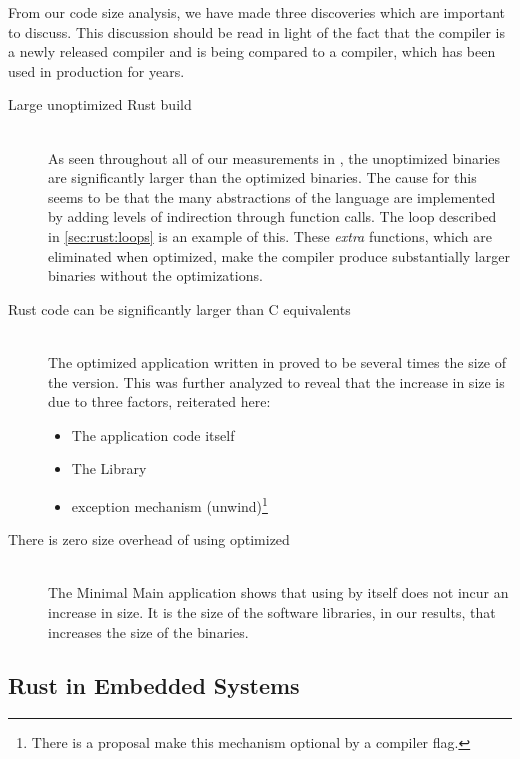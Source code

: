 From our code size analysis, we have made three discoveries which are important to discuss.
This discussion should be read in light of the fact that the {\rust} compiler is a newly released compiler and is being compared to a {\C} compiler, which has been used in production for years.

\begin{description}

\item [Large unoptimized Rust build] \hfill \\
  As seen throughout all of our measurements in {\rust}, the unoptimized binaries are significantly larger than the optimized binaries.
  The cause for this seems to be that the many abstractions of the {\rust} language are implemented by adding levels of indirection through function calls.
  The  loop described in \autoref{sec:rust:loops} is an example of this.
  These \emph{extra} functions, which are eliminated when optimized, make the compiler produce substantially larger binaries without the optimizations.

\item [Rust code can be significantly larger than C equivalents] \hfill \\
  The optimized {\tracker} application written in {\rust} proved to be several times the size of the {\C} version.
  This was further analyzed to reveal that the increase in size is due to three factors, reiterated here:
\begin{itemize}
\item The application code itself
\item The {\rust} Library
\item {\rust} exception mechanism (unwind)\footnote{There is a proposal make this mechanism optional by a compiler flag.}
\end{itemize}

\item [There is zero size overhead of using optimized {\rust}] \hfill \\
  The Minimal Main application shows that using {\rust} by itself does not incur an increase in size.
  It is the size of the software libraries, in our results, that increases the size of the {\rust} binaries.

\end{description}

\subsection{Rust in Embedded Systems}

